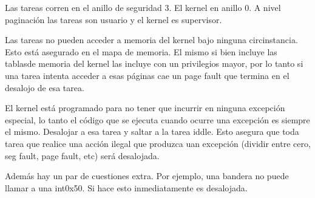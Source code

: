 	Las tareas corren en el anillo de seguridad 3. El kernel en anillo 0.
A nivel paginación las tareas son usuario y el kernel es supervisor.

	Las tareas no pueden acceder a memoria del kernel bajo ninguna circinstancia.
Esto está asegurado en el mapa de memoria. El mismo si bien incluye las tablasde memoria
del kernel las incluye con un privilegios mayor, por lo tanto si una tarea intenta
acceder a esas páginas cae un page fault que termina en el desalojo de esa tarea.

	El kernel está programado para no tener que incurrir en ninguna excepción especial,
lo tanto el código que se ejecuta cuando ocurre una excepción es siempre el mismo. Desalojar
a esa tarea y saltar a la tarea iddle. Esto asegura que toda tarea que realice una acción
ilegal que produzca uan excepción (dividir entre cero, seg fault, page fault, etc) será
desalojada.

	Además hay un par de cuestiones extra. Por ejemplo, una bandera no puede llamar a una int0x50.
Si hace esto inmediatamente es desalojada.
